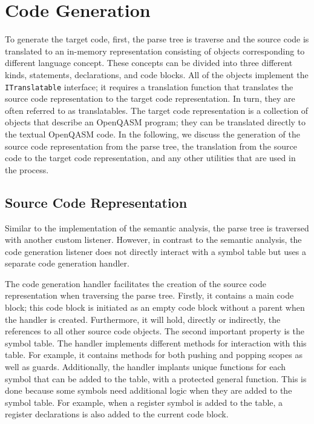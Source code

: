 \section{Code Generation}
\label{sec:implementation_codeGen}
To generate the target code, first, the parse tree is traverse and the source code is translated to an in-memory representation consisting of objects corresponding to different language concept. These concepts can be divided into three different kinds, statements, declarations, and code blocks. All of the objects implement the \texttt{ITranslatable} interface; it requires a translation function that translates the source code representation to the target code representation. In turn, they are often referred to as translatables. The target code representation is a collection of objects that describe an OpenQASM program; they can be translated directly to the textual OpenQASM code. In the following, we discuss the generation of the source code representation from the parse tree, the translation from the source code to the target code representation, and any other utilities that are used in the process.

\subsection{Source Code Representation}
\label{sec:implementation_sourceCode}
Similar to the implementation of the semantic analysis, the parse tree is traversed with another custom listener. However, in contrast to the semantic analysis, the code generation listener does not directly interact with a symbol table but uses a separate code generation handler.

The code generation handler facilitates the creation of the source code representation when traversing the parse tree. Firstly, it contains a main code block; this code block is initiated as an empty code block without a parent when the handler is created. Furthermore, it will hold, directly or indirectly, the references to all other source code objects. The second important property is the symbol table. The handler implements different methods for interaction with this table. For example, it contains methods for both pushing and popping scopes as well as guards. Additionally, the handler implants unique functions for each symbol that can be added to the table, with a protected general function. This is done because some symbols need additional logic when they are added to the symbol table. For example, when a register symbol is added to the table, a register declarations is also added to the current code block.

